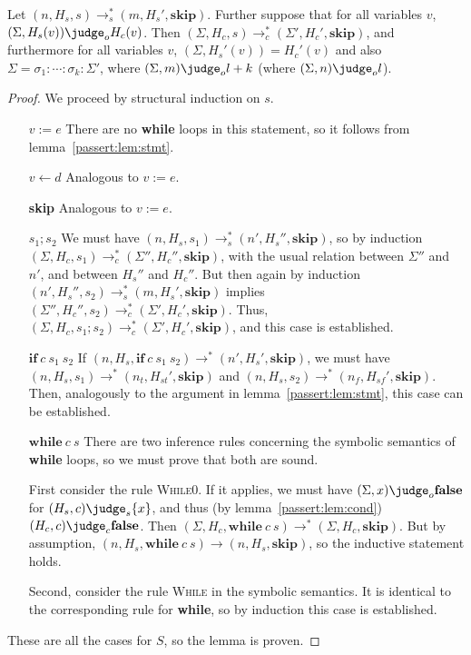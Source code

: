 \begin{lemma} \label{passert:lem:whil}
    Let $(n, H_s, s) \to_s^{*} (m, H_s', \mathbf{skip})$.
  Further suppose that for all variables $v$,
  $(\Sigma, H_s(v)) \judge_o H_c(v)$.
  Then $(\Sigma, H_c, s) \to_c^{*} (\Sigma', H_c', \mathbf{skip})$,
  and furthermore for all variables $v$,
  $(\Sigma, H_s'(v)) = H_c'(v)$ and also
  $\Sigma = \sigma_1:\dotsb:\sigma_k:\Sigma'$,
  where $(\Sigma, m) \judge_o l + k$
  (where $(\Sigma, n) \judge_o l$).
\end{lemma}

\begin{proof}
  We proceed by structural induction on $s$.

  \begin{itemize}
  \item[$v := e$] There are no \textbf{while} loops in this statement,
    so it follows from lemma~\ref{passert:lem:stmt}.
  \item[$v \leftarrow d$] Analogous to $v := e$.
  \item[\textbf{skip}] Analogous to $v := e$.
  \item[$s_1 ; s_2$] 
    We must have
    $(n, H_s, s_1) \to_s^{*} (n', H_s'', \mathbf{skip})$,
    so by induction
    $(\Sigma, H_c, s_1) \to_c^{*} (\Sigma'', H_c'', \mathbf{skip})$,
    with the usual relation between $\Sigma''$ and $n'$, and between
    $H_s''$ and $H_c''$.
    But then again by induction
    $(n', H_s'', s_2) \to_s^{*} (m, H_s', \mathbf{skip})$
    implies
    $(\Sigma'', H_c'', s_2) \to_c^{*} (\Sigma', H_c', \mathbf{skip})$.
    Thus,
    $(\Sigma, H_c, s_1;s_2) \to_c^{*} (\Sigma', H_c', \mathbf{skip})$,
    and this case is established.
  \item[$\mathbf{if}\:c\:s_1\:s_2$]
      If $(n, H_s, \mathbf{if}\:c\:s_1\:s_2) \to^{*} (n', H_s', \mathbf{skip})$,
      we must have $(n, H_s, s_1) \to^{*} (n_t, H_{st}', \mathbf{skip})$
      and $(n, H_s, s_2) \to^{*} (n_f, H_{sf}', \mathbf{skip})$.  Then,
    analogously to the argument in lemma~\ref{passert:lem:stmt}, this case can
    be established.
  \item[$\mathbf{while}\:c\:s$]
    There are two inference rules concerning the symbolic semantics of
    \textbf{while} loops, so we must prove that both are sound.

    First consider the rule \textsc{While0}. If it applies, we must
    have $(\Sigma, x) \judge_o \mathbf{false}$
    for $(H_s, c) \judge_s \{ x \}$,
    and thus (by lemma~\ref{passert:lem:cond})
    $(H_c, c) \judge_c \mathbf{false}$.
    Then
    $(\Sigma, H_c, \mathbf{while}\:c\:s) \to^{*} (\Sigma, H_c, \mathbf{skip})$.
    But by assumption,
    $(n, H_s, \mathbf{while}\:c\:s) \to (n, H_s, \mathbf{skip})$,
    so the inductive statement holds.

    Second, consider the rule \textsc{While} in the symbolic
    semantics.  It is identical to the corresponding rule for
    \textbf{while}, so by induction this case is established.
  \end{itemize}

  These are all the cases for $S$, so the lemma is proven.
  
\end{proof}

